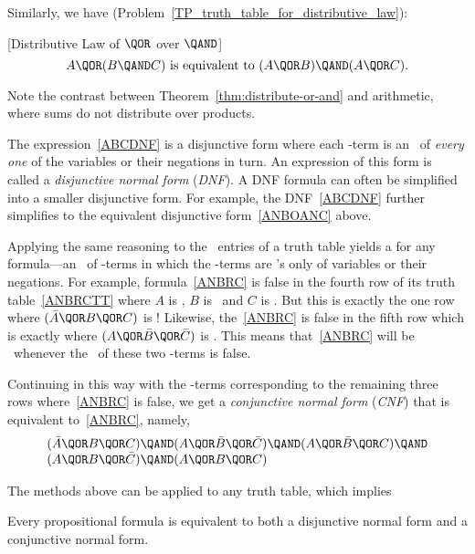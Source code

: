 Similarly, we have (Problem~\ref{TP_truth_table_for_distributive_law}):
\begin{theorem}\label{thm:distribute-or-and}[Distributive Law of $\QOR$ over $\QAND$]
\[
A \QOR (B \QAND C)\text{ is equivalent to } (A \QOR B) \QAND (A \QOR
C).
\]
\end{theorem}%
Note the contrast between Theorem~\ref{thm:distribute-or-and} and
arithmetic, where sums do not distribute over products.

The expression~\eqref{ABCDNF} is a disjunctive form where each
\QAND-term is an \QAND\ of \emph{every one} of the variables or their
negations in turn.  An expression of this form is called a
\emph{disjunctive normal form}%
%
(\emph{DNF}).  A DNF formula can often
be simplified into a smaller disjunctive form.  For example, the
DNF~\eqref{ABCDNF} further simplifies to the equivalent disjunctive
form~\eqref{ANBOANC} above.

Applying the same reasoning to the \false\ entries of a truth table
yields a  for any formula---an \QAND\
of \QOR-terms in which the \QOR-terms are \QOR's only of variables or
their negations.  For example, formula~\eqref{ANBRC} is false in the
fourth row of its truth table~\eqref{ANBRCTT} where $A$ is \true, $B$
is \false\ and $C$ is \false.  But this is exactly the one row where
$(\bar{A} \QOR B \QOR C)$ is \false!  Likewise, the~\eqref{ANBRC} is
false in the fifth row which is exactly where
$(A \QOR \bar{B} \QOR \bar{C})$ is \false.  This means
that~\eqref{ANBRC} will be \false\ whenever the \QAND\ of these
two \QOR-terms is false.  
\iffalse
$(\bar{A} \QOR B \QOR C) \QAND (A \QOR \bar{B} \QOR \bar{C})$ is \false.
\fi
Continuing in this way with the \QOR-terms corresponding to the
remaining three rows where~\eqref{ANBRC} is false, we get a
\emph{conjunctive normal form}%
(\emph{CNF})%
that is equivalent to~\eqref{ANBRC}, namely,
\[\begin{array}{l}
(\bar{A} \QOR B \QOR C)  \QAND (A \QOR \bar{B} \QOR \bar{C}) 
        \QAND (A \QOR \bar{B} \QOR C)  \QAND \\
(A \QOR B \QOR \bar{C}) \QAND (A \QOR B \QOR C)
\end{array}\]

The methods above can be applied to any truth table, which implies
\begin{theorem}
Every propositional formula is equivalent to both a disjunctive normal
form and a conjunctive normal form.
\end{theorem}

